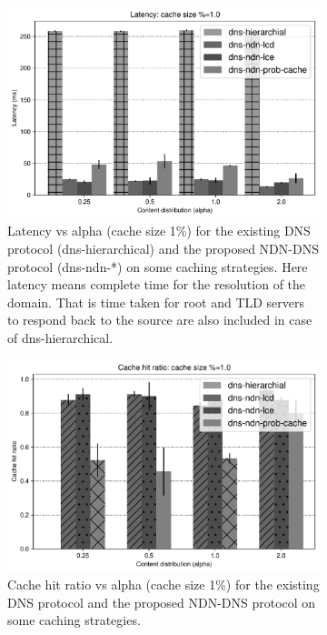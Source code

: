 \documentclass[conference]{IEEEtran}
\begin{document}
\begin{figure}[htbp]
    \centering
    \begin{subfigure}[b]{\linewidth}
        \centering
        \includegraphics[width=0.85\linewidth]{images/LATENCY_C=0.01.pdf}
        \caption{Latency vs alpha (cache size 1\%) for the existing DNS protocol (dns-hierarchical) and the proposed NDN-DNS protocol (dns-ndn-*) on some caching strategies. Here latency means complete time for the resolution of the domain. That is time taken for root and TLD servers to respond back to the source are also included in case of dns-hierarchical.}
    \end{subfigure}
    \begin{subfigure}[b]{\linewidth}
        \centering
        \includegraphics[width=0.85\linewidth]{images/CACHE_HIT_RATIO__C=0.01.pdf}
        \caption{Cache hit ratio vs alpha (cache size 1\%) for the existing DNS protocol and the proposed NDN-DNS protocol on some caching strategies.}
    \end{subfigure}
    \begin{subfigure}[b]{\linewidth}

\end{subfigure}
\end{figure}
\end{document}
